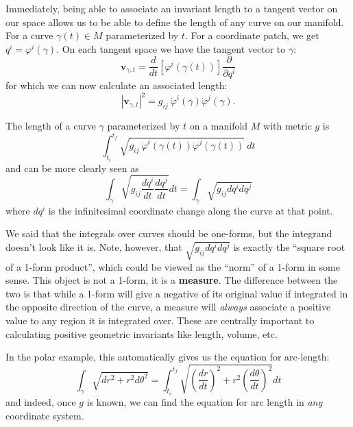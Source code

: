 	Immediately, being able to associate an invariant length to a tangent vector on our space allows us to be able to define the length of any curve on our manifold. For a curve $\gamma(t) \in M$ parameterized by $t$. For a coordinate patch, we get $q^i = \varphi^i(\gamma)$. On each tangent space we have the tangent vector to $\gamma$:
	\begin{equation}
		\mathbf v_{\gamma,t} = \frac{d}{dt} \left[ \varphi^i(\gamma(t)) \right] \frac{\partial}{\partial q^i}
	\end{equation}
	for which we can now calculate an associated length: 
	\begin{equation}
		|\mathbf v_{\gamma,t}|^2 = g_{ij} ~ \dot \varphi^i(\gamma) \dot \varphi^j(\gamma).
	\end{equation}
	\begin{prop}
		The length of a curve $\gamma$ parameterized by $t$ on a manifold $M$ with metric $g$ is
		\begin{equation}
			\int_{t_i}^{t_f} \sqrt{g_{ij} ~ \dot \varphi^i(\gamma(t)) \dot \varphi^j(\gamma(t))} ~ dt
		\end{equation}
		and can be more clearly seen as
		\begin{equation}
			\int_{\gamma} \sqrt{g_{ij} \frac{dq^i}{dt} \frac{dq^j}{dt}} dt = \int_{\gamma} \sqrt{g_{ij} dq^i dq^j}
		\end{equation}
		where $dq^i$ is the infinitesimal coordinate change along the curve at that point.
	\end{prop}
	We said that the integrals over curves should be one-forms, but the integrand doesn't look like it is. Note, however, that $\sqrt{g_{ij} dq^i dq^j}$ is exactly the ``square root of a 1-form product'', which could be viewed as the ``norm'' of a 1-form in some sense. This object is not a 1-form, it is a \textbf{measure}. The difference between the two is that while a 1-form will give a negative of its original value if integrated in the opposite direction of the curve, a measure will \emph{always} associate a positive value to any region it is integrated over. These are centrally important to calculating positive geometric invariants like length, volume, etc. 
	
	In the polar example, this automatically gives us the equation for arc-length:
	\begin{equation}
		\int_{\gamma} \sqrt{dr^2 + r^2 d\theta^2} 
		= \int_{t_i}^{t_f} \sqrt{\left( \frac{dr}{dt}\right)^2+ r^2 \left( \frac{d\theta}{dt} \right)^2 } dt
	\end{equation}
	and indeed, once $g$ is known, we can find the equation for arc length in \emph{any} coordinate system. 
	

